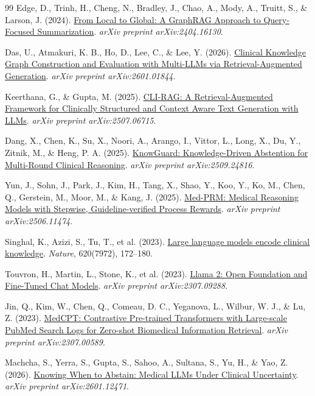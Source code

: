 \begin{thebibliography}{99}
Edge, D., Trinh, H., Cheng, N., Bradley, J., Chao, A., Mody, A., Truitt, S., \& Larson, J. (2024).
\href{https://arxiv.org/abs/2404.16130}{From Local to Global: A GraphRAG Approach to Query-Focused Summarization}.
\textit{arXiv preprint arXiv:2404.16130}.

Das, U., Atmakuri, K. B., Ho, D., Lee, C., \& Lee, Y. (2026).
\href{https://arxiv.org/abs/2601.01844}{Clinical Knowledge Graph Construction and Evaluation with Multi-LLMs via Retrieval-Augmented Generation}.
\textit{arXiv preprint arXiv:2601.01844}.

Keerthana, G., \& Gupta, M. (2025).
\href{https://arxiv.org/abs/2507.06715}{CLI-RAG: A Retrieval-Augmented Framework for Clinically Structured and Context Aware Text Generation with LLMs}.
\textit{arXiv preprint arXiv:2507.06715}.

Dang, X., Chen, K., Su, X., Noori, A., Arango, I., Vittor, L., Long, X., Du, Y., Zitnik, M., \& Heng, P. A. (2025).
\href{https://arxiv.org/abs/2509.24816}{KnowGuard: Knowledge-Driven Abstention for Multi-Round Clinical Reasoning}.
\textit{arXiv preprint arXiv:2509.24816}.

Yun, J., Sohn, J., Park, J., Kim, H., Tang, X., Shao, Y., Koo, Y., Ko, M., Chen, Q., Gerstein, M., Moor, M., \& Kang, J. (2025).
\href{https://arxiv.org/abs/2506.11474}{Med-PRM: Medical Reasoning Models with Stepwise, Guideline-verified Process Rewards}.
\textit{arXiv preprint arXiv:2506.11474}.

Singhal, K., Azizi, S., Tu, T., et al. (2023).
\href{https://doi.org/10.1038/s41586-023-06291-2}{Large language models encode clinical knowledge}.
\textit{Nature}, 620(7972), 172--180.

Touvron, H., Martin, L., Stone, K., et al. (2023).
\href{https://arxiv.org/abs/2307.09288}{Llama 2: Open Foundation and Fine-Tuned Chat Models}.
\textit{arXiv preprint arXiv:2307.09288}.

Jin, Q., Kim, W., Chen, Q., Comeau, D. C., Yeganova, L., Wilbur, W. J., \& Lu, Z. (2023).
\href{https://arxiv.org/abs/2307.00589}{MedCPT: Contrastive Pre-trained Transformers with Large-scale PubMed Search Logs for Zero-shot Biomedical Information Retrieval}.
\textit{arXiv preprint arXiv:2307.00589}.

Machcha, S., Yerra, S., Gupta, S., Sahoo, A., Sultana, S., Yu, H., \& Yao, Z. (2026).
\href{https://arxiv.org/abs/2601.12471}{Knowing When to Abstain: Medical LLMs Under Clinical Uncertainty}.
\textit{arXiv preprint arXiv:2601.12471}.


\end{thebibliography}
